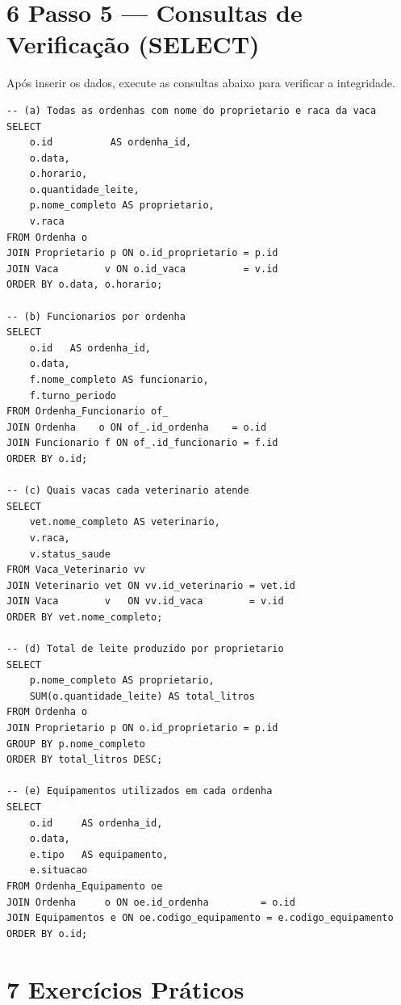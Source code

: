 \documentclass[12pt]{article}
\begin{document}
\section*{6 \enspace Passo 5 — Consultas de Verificação (SELECT)}

Após inserir os dados, execute as consultas abaixo para verificar a integridade.

\begin{lstlisting}[caption={Consultas básicas de verificação}]
-- (a) Todas as ordenhas com nome do proprietario e raca da vaca
SELECT
    o.id          AS ordenha_id,
    o.data,
    o.horario,
    o.quantidade_leite,
    p.nome_completo AS proprietario,
    v.raca
FROM Ordenha o
JOIN Proprietario p ON o.id_proprietario = p.id
JOIN Vaca        v ON o.id_vaca          = v.id
ORDER BY o.data, o.horario;

-- (b) Funcionarios por ordenha
SELECT
    o.id   AS ordenha_id,
    o.data,
    f.nome_completo AS funcionario,
    f.turno_periodo
FROM Ordenha_Funcionario of_
JOIN Ordenha    o ON of_.id_ordenha    = o.id
JOIN Funcionario f ON of_.id_funcionario = f.id
ORDER BY o.id;

-- (c) Quais vacas cada veterinario atende
SELECT
    vet.nome_completo AS veterinario,
    v.raca,
    v.status_saude
FROM Vaca_Veterinario vv
JOIN Veterinario vet ON vv.id_veterinario = vet.id
JOIN Vaca        v   ON vv.id_vaca        = v.id
ORDER BY vet.nome_completo;

-- (d) Total de leite produzido por proprietario
SELECT
    p.nome_completo AS proprietario,
    SUM(o.quantidade_leite) AS total_litros
FROM Ordenha o
JOIN Proprietario p ON o.id_proprietario = p.id
GROUP BY p.nome_completo
ORDER BY total_litros DESC;

-- (e) Equipamentos utilizados em cada ordenha
SELECT
    o.id     AS ordenha_id,
    o.data,
    e.tipo   AS equipamento,
    e.situacao
FROM Ordenha_Equipamento oe
JOIN Ordenha     o ON oe.id_ordenha         = o.id
JOIN Equipamentos e ON oe.codigo_equipamento = e.codigo_equipamento
ORDER BY o.id;
\end{lstlisting}

\vspace{0.5cm}

\section*{7 \enspace Exercícios Práticos}
\end{document}
